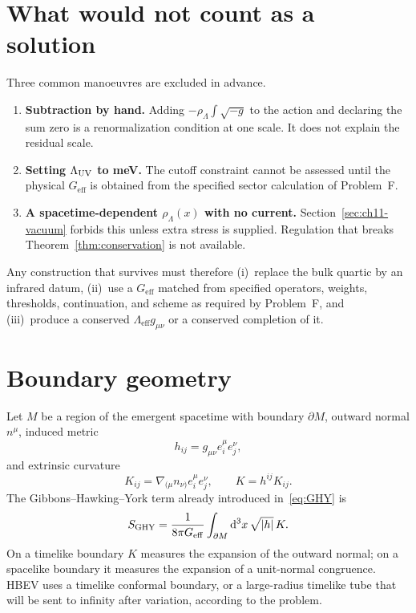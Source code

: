 \section{What would not count as a solution}
\label{sec:ch12-not}

Three common manoeuvres are excluded in advance.

\begin{enumerate}
  \item \textbf{Subtraction by hand.}
        Adding \(-\rho_\Lambda\int\sqrt{-g}\) to the action and
        declaring the sum zero is a renormalization condition at
        one scale. It does not explain the residual scale.
  \item \textbf{Setting \(\Lambda_{\mathrm{UV}}\) to meV.}
        The cutoff constraint cannot be assessed until the physical
        \(G_{\mathrm{eff}}\) is obtained from the specified sector
        calculation of Problem~F.
  \item \textbf{A spacetime-dependent \(\rho_\Lambda(x)\) with no
        current.}
        Section~\ref{sec:ch11-vacuum} forbids this unless extra
        stress is supplied. Regulation that breaks
        Theorem~\ref{thm:conservation} is not available.
\end{enumerate}

Any construction that survives must therefore (i)~replace the bulk
quartic by an infrared datum, (ii)~use a \(G_{\mathrm{eff}}\) matched
from specified operators, weights, thresholds, continuation, and
scheme as required by Problem~F, and (iii)~produce a conserved
\(\Lambda_{\mathrm{eff}}g_{\mu\nu}\) or a conserved completion of
it.

\section{Boundary geometry}
\label{sec:ch12-boundary}

Let \(M\) be a region of the emergent spacetime with boundary
\(\partial M\), outward normal \(n^\mu\), induced metric
\begin{equation}
  \label{eq:induced}
  h_{ij}=g_{\mu\nu}e^\mu_i e^\nu_j,
\end{equation}
and extrinsic curvature
\begin{equation}
  \label{eq:K}
  K_{ij}=\nabla_{(\mu}n_{\nu)}e^\mu_i e^\nu_j,
  \qquad
  K=h^{ij}K_{ij}.
\end{equation}
The Gibbons--Hawking--York term already introduced
in~\eqref{eq:GHY} is
\begin{equation}
  \label{eq:GHY-again}
  S_{\mathrm{GHY}}
  =\frac{1}{8\pi G_{\mathrm{eff}}}
   \int_{\partial M}\mathrm{d}^3x\,\sqrt{|h|}\,K.
\end{equation}
On a timelike boundary \(K\) measures the expansion of the outward
normal; on a spacelike boundary it measures the expansion of a
unit-normal congruence. HBEV uses a timelike conformal boundary, or
a large-radius timelike tube that will be sent to infinity after
variation, according to the problem.

